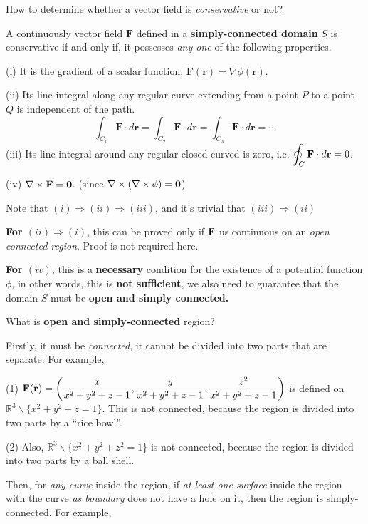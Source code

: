 \begin{spacing}{1.3}
    \newpage
    {\blue How to determine whether a vector field is {\it conservative} or not?}

    A continuously vector field $\mathbf{F}$ defined in a {\bf simply-connected domain} $S$ is conservative 
    if and only if, it possesses {\it any one} of the following properties.
    
    (i) It is the gradient of a scalar function, $\mathbf{F}(\mathbf{r})=\nabla \phi(\mathbf{r})$.
    
    (ii) Its line integral along any regular curve extending from a point $P$ to a point $Q$ is independent of the path.
    $$
    \int_{C_{1}} \mathbf{F} \cdot d \mathbf{r}=\int_{C_{2}} \mathbf{F} \cdot d \mathbf{r}=\int_{C_{3}} \mathbf{F} \cdot d \mathbf{r}=\cdots
    $$
    (iii) Its line integral around any regular closed curved is zero, i.e. $\displaystyle \oint_{C} \mathbf{F} \cdot d \mathbf{r}=0$.

    (iv) $\nabla \times {\bf F} ={\bf 0}$. (since $\nabla \times (\nabla\times \phi)={\bf 0}$)

    {\blue Note that $(i)\Rightarrow (ii)\Rightarrow (iii)$, and it's trivial that $(iii)\Rightarrow (ii)$}

    \vspace{0.2in}
    {\bf For $(ii)\Rightarrow (i)$}, this can be proved only if ${\bf F}$ us continuous on an {\it open connected region}.
    Proof is not required here.

    {\bf For $(iv)$}, this is a {\bf necessary} condition for the existence of a potential function $\phi$,
    in other words, this is {\bf not sufficient}, we also need to guarantee that the domain $S$ 
    must be {\bf open and simply connected.}

    \vspace{0.3in}
    What is {\bf open and simply-connected} region?

    Firstly, it must be {\it connected}, it cannot be divided into two parts that are separate. For example,

    (1) $\displaystyle {\bf F}({\bf r})=\left(\frac{x}{x^2+y^2+z-1}, \frac{y}{x^2+y^2+z-1}, \frac{z^2}{x^2+y^2+z-1}\right)$
    is defined on $\mathbb{R}^3\backslash \{x^2+y^2+z=1\}$. This is not connected, because the region 
    is divided into two parts by a ``rice bowl''.

    (2) Also, $\mathbb{R}^3\backslash \{x^2+y^2+z^2=1\}$ is not connected, because the region 
    is divided into two parts by a ball shell.

    Then, for {\it any curve} inside the region, if {\it at least one surface} inside the region
    with the curve {\it as boundary}
    does not have a hole on it, then the region is simply-connected. For example,


\end{spacing}
